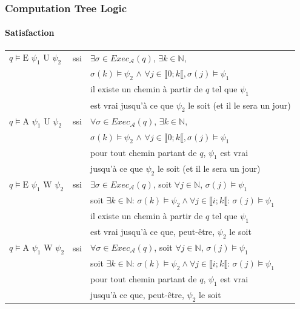 \documentclass[11pt]{beamer}
\begin{document}
\begin{frame}
    \frametitle{Computation Tree Logic}
    \framesubtitle{Satisfaction}

    \footnotesize
    \begin{tabular}{lcl}
    $q \vDash \mbox{E } \psi_1 \mbox{ U } \psi_2$ &ssi&
    $\exists \sigma \in Exec_\mathcal{A}(q)$, $\exists k \in \mathbb{N}$,\\
    &&$\sigma(k)\vDash \psi_2$ $\land$ $\forall j \in \llbracket 0; k\llbracket, \sigma(j)\vDash \psi_1$\\
    && \pause[2]il existe un chemin à partir de $q$ tel que $\psi_1$\\&& est vrai jusqu'à ce que $\psi_2$ le soit (et il le sera un jour) \pause[1]\\

    $q \vDash \mbox{A } \psi_1 \mbox{ U } \psi_2$ &ssi&
    $\forall \sigma \in Exec_\mathcal{A}(q)$, $\exists k \in \mathbb{N}$,\\
    &&$\sigma(k)\vDash \psi_2$ $\land$ $\forall j \in \llbracket 0; k\llbracket, \sigma(j)\vDash \psi_1$\\
    &&\pause[2]pour tout chemin partant de $q$, $\psi_1$ est vrai \\&& jusqu'à ce que $\psi_2$ le soit (et il le sera un jour)\pause[1]\\

    $q \vDash \mbox{E } \psi_1 \mbox{ W } \psi_2$ &ssi&
    $\exists \sigma \in Exec_\mathcal{A}(q)$, soit $\forall j \in \mathbb{N}$, $\sigma(j) \vDash \psi_1$\\
    & & \pause[2]soit $\exists k\in \mathbb{N}$: $\sigma(k)\vDash \psi_2 \land \forall j \in \llbracket i; k \llbracket$: $\sigma(j) \vDash \psi_1$\\
    && il existe un chemin à partir de $q$ tel que $\psi_1$\\&& est vrai jusqu'à ce que, peut-être, $\psi_2$ le soit\pause[1]\\

    $q \vDash \mbox{A } \psi_1 \mbox{ W } \psi_2$ &ssi&
    $\forall \sigma \in Exec_\mathcal{A}(q)$, soit $\forall j \in \mathbb{N}$, $\sigma(j) \vDash \psi_1$\\
    & & \pause[2]soit $\exists k\in \mathbb{N}$: $\sigma(k)\vDash \psi_2 \land \forall j \in \llbracket i; k \llbracket$: $\sigma(j) \vDash \psi_1$\\
    && pour tout chemin partant de $q$, $\psi_1$ est vrai \\&& jusqu'à ce que, peut-être, $\psi_2$ le soit\pause[1]\\
    \end{tabular}

\end{frame}
\end{document}
